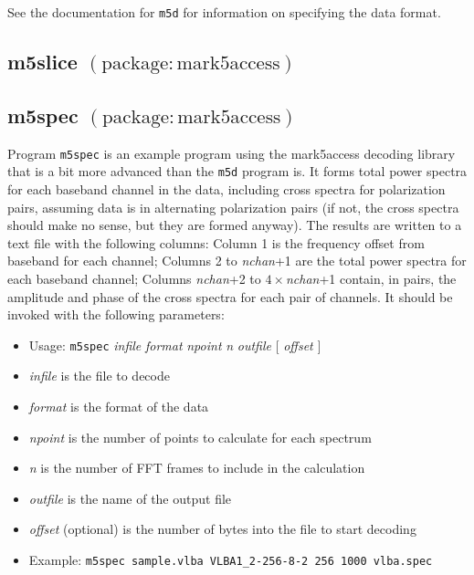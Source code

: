 See the documentation for {\tt m5d} for information on specifying the data format.








\subsection{m5slice {\small $\mathrm{(package: mark5access)}$}} \label{sec:m5slice}






\subsection{m5spec {\small $\mathrm{(package: mark5access)}$}} \label{sec:m5spec}

Program {\tt m5spec} is an example program using the mark5access decoding library that is a bit more advanced than the {\tt m5d} program is.
It forms total power spectra for each baseband channel in the data, including cross spectra for polarization pairs, assuming data is in alternating polarization pairs (if not, the cross spectra should make no sense, but they are formed anyway).
The results are written to a text file with the following columns: Column 1 is the frequency offset from baseband for each channel; Columns 2 to {\em nchan}+1 are the total power spectra for each baseband channel; Columns {\em nchan}+2 to $4 \times${\em nchan}+1 contain, in pairs, the amplitude and phase of the cross spectra for each pair of channels.
It should be invoked with the following parameters:

\begin{itemize}
\item[] Usage: {\tt m5spec} {\em infile} {\em format} {\em npoint} {\em n} {\em outfile} $[$ {\em offset} $]$ 
\item[] {\em infile} is the file to decode
\item[] {\em format} is the format of the data
\item[] {\em npoint} is the number of points to calculate for each spectrum
\item[] {\em n} is the number of FFT frames to include in the calculation
\item[] {\em outfile} is the name of the output file
\item[] {\em offset} (optional) is the number of bytes into the file to start decoding
\item[] Example: {\tt m5spec sample.vlba VLBA1\_2-256-8-2 256 1000 vlba.spec}
\end{itemize}

